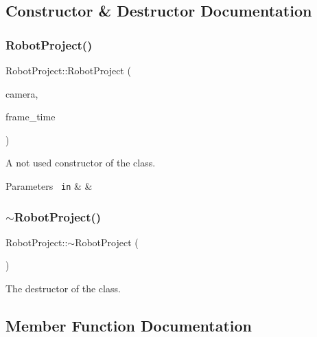 \subsection{Constructor \& Destructor Documentation}
\mbox{\label{class_robot_project_a3afaaa8731fb02fabaf2c47bb7c81799}} 
\subsubsection{\texorpdfstring{RobotProject()}{RobotProject()}}
{\footnotesize\ttfamily Robot\+Project\+::\+Robot\+Project (\begin{DoxyParamCaption}\item[{\mbox{\hyperlink{class_camera_capture}{Camera\+Capture}} $\ast$}]{camera,  }\item[{double \&}]{frame\+\_\+time }\end{DoxyParamCaption})}



A not used constructor of the class. 


\begin{DoxyParams}[1]{Parameters}
\mbox{\texttt{ in}}  & {\em } & \\
\hline
\end{DoxyParams}
\mbox{\label{class_robot_project_a8510ebe175da3b90ffea7c88b690b4f8}} 
\subsubsection{\texorpdfstring{$\sim$RobotProject()}{~RobotProject()}}
{\footnotesize\ttfamily Robot\+Project\+::$\sim$\+Robot\+Project (\begin{DoxyParamCaption}{ }\end{DoxyParamCaption})}



The destructor of the class. 



\subsection{Member Function Documentation}
\mbox{\label{class_robot_project_a9899c66898ccd1b638fe074797a18398}} 

